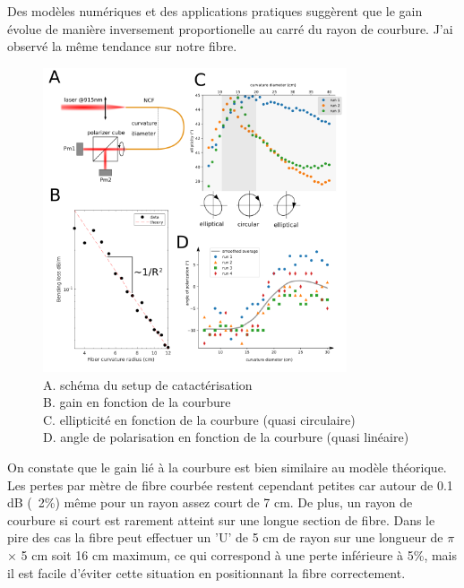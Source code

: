 Des modèles numériques \cite{yu_negative_2016} \cite{setti_flexible_2013} et des applications pratiques suggèrent que le gain évolue de manière inversement proportionelle au carré du rayon de courbure. J'ai observé la même tendance sur notre fibre.

\begin{figure}
\centering
\includegraphics[width=0.8\textwidth]{./files/fiber_bending.png}
\caption{A. schéma du setup de catactérisation
\\ B. gain en fonction de la courbure
\\ C. ellipticité en fonction de la courbure (quasi circulaire)
\\ D. angle de polarisation en fonction de la courbure (quasi linéaire)}
\end{figure}



On constate que le gain lié à la courbure est bien similaire au modèle théorique. Les pertes par mètre de fibre courbée restent cependant petites car autour de 0.1 dB (~2\%) même pour un rayon assez court de 7 cm. De plus, un rayon de courbure si court est rarement atteint sur une longue section de fibre. Dans le pire des cas la fibre peut effectuer un 'U' de 5 cm de rayon sur une longueur de $\pi$ × 5 cm soit 16 cm maximum, ce qui correspond à une perte inférieure à 5\%, mais il est facile d'éviter cette situation en positionnant la fibre correctement. 


